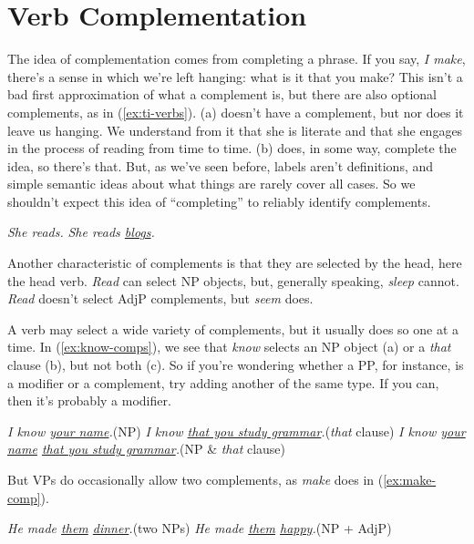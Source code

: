 \section{Verb Complementation}\label{sec:verb-complementation}

The idea of complementation comes from completing a phrase. If you say, \textit{I make}, there's a sense in which we're left hanging: what is it that you make? This isn't a bad first approximation of what a complement is, but there are also optional complements, as in (\ref{ex:ti-verbs}). (a) doesn't have a complement, but nor does it leave us hanging. We understand from it that she is literate and that she engages in the process of reading from time to time. (b) does, in some way, complete the idea, so there's that. But, as we've seen before, labels aren't definitions, and simple semantic ideas about what things are rarely cover all cases. So we shouldn't expect this idea of ``completing'' to reliably identify complements.

\ea\label{ex:ti-verbs}
\ea \textit{She reads.}
\ex \textit{She reads \uline{blogs}.}
\z\z

Another characteristic of complements is that they are selected by the head, here the head verb. \textit{Read} can select NP objects, but, generally speaking, \textit{sleep} cannot. \textit{Read} doesn't select AdjP complements, but \textit{seem} does.

A verb may select a wide variety of complements, but it usually does so one at a time. In (\ref{ex:know-comps}), we see that \textit{know} selects an NP object (a) or a \textit{that} clause (b), but not both (c). So if you're wondering whether a PP, for instance, is a modifier or a complement, try adding another of the same type. If you can, then it's probably a modifier.

\ea\label{ex:know-comps}
\ea \textit{I know \uline{your name}.}\hfill(NP)
\ex \textit{I know \uline{that you study grammar}.}\hfill(\textit{that} clause)
\ex *\textit{I know \uline{your name} \uline{that you study grammar}.}\hfill(NP \& \textit{that} clause)
\z\z

But VPs do occasionally allow two complements, as \textit{make} does in (\ref{ex:make-comp}).

\ea\label{ex:make-comp}
\ea \textit{He made \uline{them} \uline{dinner}.}\hfill(two NPs)
\ex \textit{He made \uline{them} \uline{happy}.}\hfill(NP + AdjP)
\z\z

